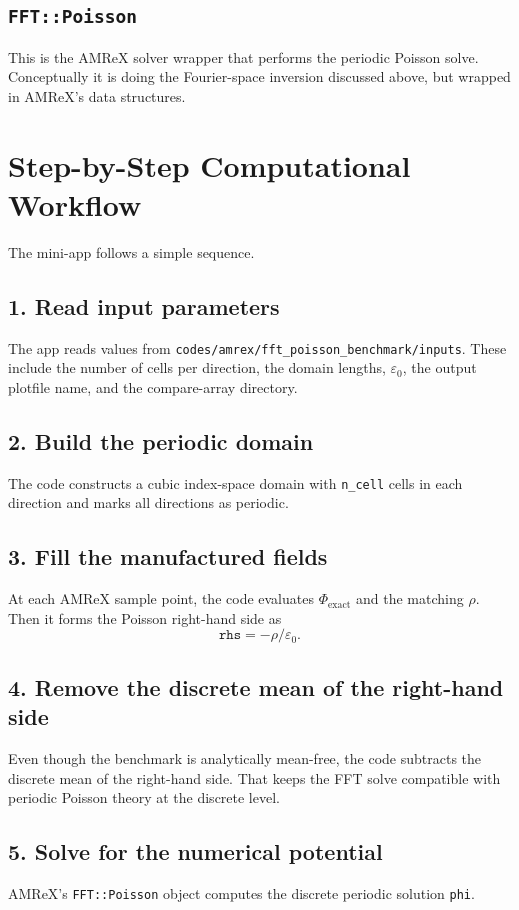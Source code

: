 \documentclass[11pt]{article}
\begin{document}
\subsection*{\texttt{FFT::Poisson}}
This is the AMReX solver wrapper that performs the periodic Poisson solve. Conceptually it is doing the Fourier-space inversion discussed above, but wrapped in AMReX's data structures.

\section{Step-by-Step Computational Workflow}
The mini-app follows a simple sequence.

\subsection*{1. Read input parameters}
The app reads values from \texttt{codes/amrex/fft\_poisson\_benchmark/inputs}. These include the number of cells per direction, the domain lengths, $\varepsilon_0$, the output plotfile name, and the compare-array directory.

\subsection*{2. Build the periodic domain}
The code constructs a cubic index-space domain with \texttt{n\_cell} cells in each direction and marks all directions as periodic.

\subsection*{3. Fill the manufactured fields}
At each AMReX sample point, the code evaluates $\Phi_{\text{exact}}$ and the matching $\rho$. Then it forms the Poisson right-hand side as
\[
\texttt{rhs} = -\rho/\varepsilon_0.
\]

\subsection*{4. Remove the discrete mean of the right-hand side}
Even though the benchmark is analytically mean-free, the code subtracts the discrete mean of the right-hand side. That keeps the FFT solve compatible with periodic Poisson theory at the discrete level.

\subsection*{5. Solve for the numerical potential}
AMReX's \texttt{FFT::Poisson} object computes the discrete periodic solution \texttt{phi}.
\end{document}
